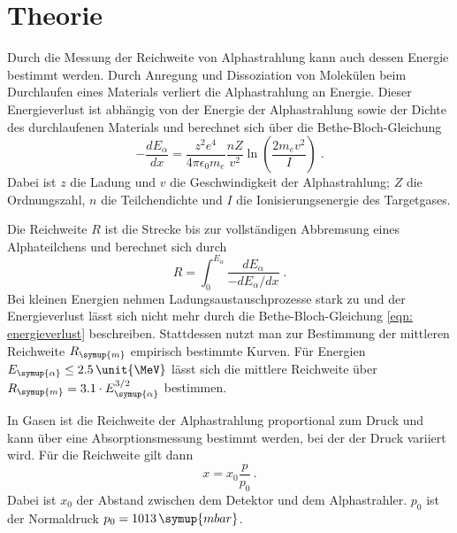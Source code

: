 \section{Theorie}
\label{sec:Theorie}

Durch die Messung der Reichweite von Alphastrahlung kann auch dessen
Energie bestimmt werden. Durch Anregung und Dissoziation von Molekülen beim 
Durchlaufen eines Materials verliert die Alphastrahlung an Energie. Dieser
Energieverlust ist abhängig von der Energie der Alphastrahlung sowie der
Dichte des durchlaufenen Materials und berechnet sich über die Bethe-Bloch-Gleichung
\begin{equation}
    -\frac{d E_\alpha}{d x}=\frac{z^2 e^4}{4 \pi \epsilon_0 m_e} \frac{n Z}{v^2} \ln \left(\frac{2 m_e v^2}{I}\right) \; .
    \label{eqn: energieverlust}
\end{equation}
Dabei ist $z$ die Ladung und $v$ die Geschwindigkeit der Alphastrahlung; $Z$ die Ordnungszahl,
$n$ die Teilchendichte und $I$ die Ionisierungsenergie des Targetgases. 

Die Reichweite $R$ ist die Strecke bis zur vollständigen Abbremsung eines 
Alphateilchens und berechnet sich durch 
\begin{equation*}
    R=\int_0^{E_\alpha} \frac{d E_\alpha}{-d E_\alpha / d x} \; .
\end{equation*}
Bei kleinen Energien nehmen Ladungsaustauschprozesse stark zu und der
Energieverlust lässt sich nicht mehr durch die Bethe-Bloch-Gleichung 
\eqref{eqn: energieverlust} beschreiben. Stattdessen nutzt man zur Bestimmung
der mittleren Reichweite $R_{\symup{m}}$ empirisch bestimmte Kurven. Für 
Energien $E_{\symup{\alpha}} \leq 2.5 \, \unit{\MeV}$ lässt sich die mittlere 
Reichweite über $R_{\symup{m}} = 3.1 \cdot E_{\symup{\alpha}}^{3/2}$ bestimmen.

In Gasen ist die Reichweite der Alphastrahlung proportional zum Druck und kann
über eine Absorptionsmessung bestimmt werden, bei der der Druck variiert wird.
Für die Reichweite gilt dann 
\begin{equation*}
    x = x_0 \frac{p}{p_0} \, .
\end{equation*}
Dabei ist $x_0$ der Abstand zwischen dem Detektor und dem Alphastrahler. 
$p_0$ ist der Normaldruck $p_0 = 1013 \, \symup{mbar}$.